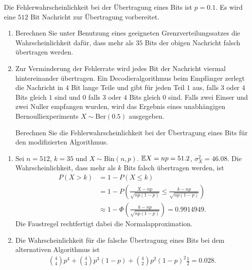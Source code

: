  Die Fehlerwahrscheinlichkeit
bei der Übertragung eines Bits ist $p=0.1$. Es wird eine $512$ Bit Nachricht zur Übertragung
vorbereitet.
\begin{enumerate}
    \item Berechnen Sie unter Benutzung eines geeigneten Grenzverteilungssatzes
        die Wahrscheinlichkeit dafür, dass mehr als $35$ Bits der obigen
        Nachricht falsch übertragen werden.

    \item Zur Verminderung der Fehlerrate wird jedes Bit der Nachricht viermal
        hintereinander übertragen. Ein Decodieralgorithmus beim Empfänger zerlegt
        die Nachricht in $4$ Bit lange Teile und gibt für jeden Teil $1$ aus,
        falls $3$ oder $4$ Bits gleich $1$ sind und $0$ falls $3$ oder $4$ Bits
        gleich $0$ sind. Falls zwei Einser und zwei Nuller empfangen wurden,
        wird das Ergebnis eines unabhängigen Bernoulliexperiments $X\sim
        \text{Ber}(0.5)$ ausgegeben. 
        
        Berechnen Sie die Fehlerwahrscheinlichkeit bei der Übertragung eines
        Bits für den modifizierten Algorithmus. 
\end{enumerate}

\solution
\begin{enumerate}
    \item Sei $n=512$, $k=35$ und $X \sim \text{Bin}(n,
        p)$. $\mathbb{E} X = np= 51.2$, $\sigma^{2}_{X} = 46.08$. Die Wahrscheinlichkeit,
        dass mehr als $k$ Bits falsch übertragen werden, ist 
        \begin{align*}
            P\left( X > k \right) &= 1 - P\left( X \leq k \right) \\
            &= 1- P\left( \frac{X - np}{\sqrt{np(1-p)}} \leq \frac{k -np}{ \sqrt{np(1-p)}} \right) \\
            &\approx 1 - \Phi\left( \frac{k -np}{ \sqrt{np(1-p)}}  \right) =  0.9914949.
        \end{align*}
        Die Faustregel rechtfertigt dabei die Normalapproximation. 
    \item Die Wahrscheinlichkeit für die falsche Übertragung eines Bits bei dem alternativen 
        Algorithmus ist 
        \begin{align*}
            \binom{4}{4} p^{4} + \binom{4}{3} p^{3}(1-p) + \binom{4}{2} p^2 (1-p)^{2} \frac{1}{2} = 0.028.
        \end{align*}
\end{enumerate}


